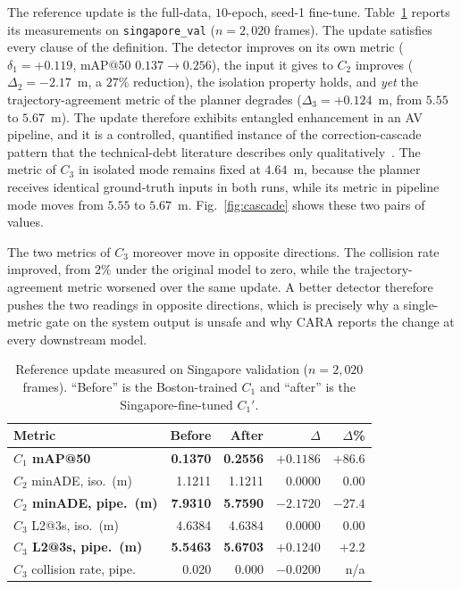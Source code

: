 \documentclass[conference]{IEEEtran}
\begin{document}
The reference update is the full-data, $10$-epoch, seed-1 fine-tune.
Table~\ref{tab:results} reports its measurements on \texttt{singapore\_val}
($n=2{,}020$ frames). The update satisfies every clause of the definition. The detector improves on its own metric ($\delta_1 = +0.119$, mAP@50
$0.137 \to 0.256$), the input it gives to $C_2$ improves ($\Delta_2 = -2.17$~m, a
$27\%$ reduction), the isolation property holds, and \emph{yet} the
trajectory-agreement metric of the planner degrades ($\Delta_3 = +0.124$~m, from
$5.55$ to $5.67$~m). The update therefore exhibits entangled enhancement in an AV
pipeline, and it is a controlled, quantified instance of the correction-cascade
pattern that the technical-debt literature describes only
qualitatively~\cite{sculley2015hidden}. The metric of $C_3$ in isolated mode
remains fixed at $4.64$~m, because the planner receives identical ground-truth
inputs in both runs, while its metric in pipeline mode moves from $5.55$ to
$5.67$~m. Fig.~\ref{fig:cascade} shows these two pairs of values.

The two metrics of $C_3$ moreover move in opposite directions. The collision rate
improved, from $2\%$ under the original model to zero, while the
trajectory-agreement metric worsened over the same update. A better detector
therefore pushes the two readings in opposite directions, which is precisely why a
single-metric gate on the system output is unsafe and why CARA reports the change
at every downstream model.

\begin{table}[htbp]
\caption{Reference update measured on Singapore validation ($n=2{,}020$ frames).
``Before'' is the Boston-trained $C_1$ and ``after'' is the Singapore-fine-tuned
$C_1'$.}
\label{tab:results}
\centering
\renewcommand{\arraystretch}{1.2}
\setlength{\tabcolsep}{4pt}
\begin{tabular}{@{}lrrrr@{}}
\toprule
\textbf{Metric} & \textbf{Before} & \textbf{After} & \textbf{$\Delta$} & \textbf{$\Delta$\%} \\
\midrule
\textbf{$C_1$ mAP@50}       & \textbf{0.1370}  & \textbf{0.2556} & $\mathbf{+0.1186}$  & $\mathbf{+86.6}$ \\
$C_2$ minADE, iso.\ (m)      & 1.1211  & 1.1211 & $0.0000$   & $0.00$   \\
\textbf{$C_2$ minADE, pipe.\ (m)} & \textbf{7.9310} & \textbf{5.7590} & $\mathbf{-2.1720}$ & $\mathbf{-27.4}$ \\
$C_3$ L2@3s, iso.\ (m)       & 4.6384  & 4.6384 & $0.0000$   & $0.00$   \\
\textbf{$C_3$ L2@3s, pipe.\ (m)} & \textbf{5.5463} & \textbf{5.6703} & $\mathbf{+0.1240}$ & $\mathbf{+2.2}$ \\
$C_3$ collision rate, pipe. & 0.020   & 0.000  & $-0.0200$   & n/a \\
\bottomrule
\end{tabular}
\end{table}
\end{document}
